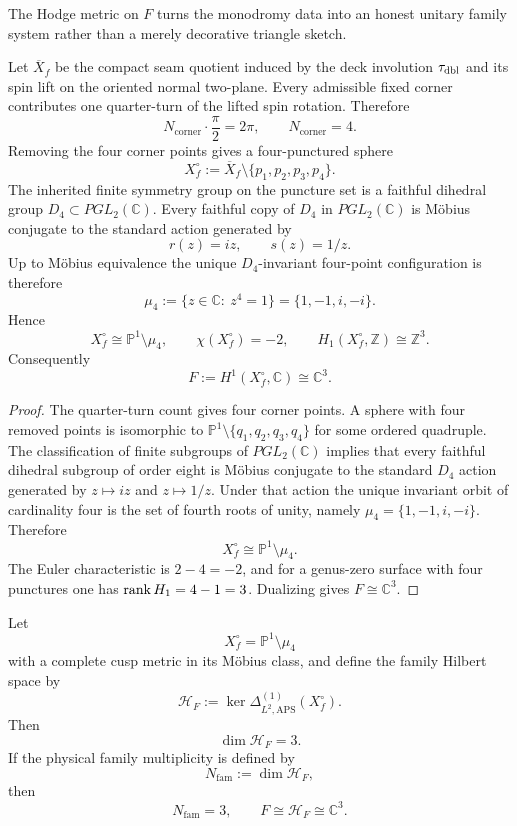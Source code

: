 The Hodge metric on $F$ turns the monodromy data into an honest unitary family system rather than a merely decorative triangle sketch.

\begin{theorem}
\label{thm:topological-family-closure}
Let $\overline X_f$ be the compact seam quotient induced by the deck involution $\tau_{\mathrm{dbl}}$ and its
spin lift on the oriented normal two-plane. Every admissible fixed corner contributes one
quarter-turn of the lifted spin rotation. Therefore
\[
N_{\mathrm{corner}}\cdot \frac{\pi}{2}=2\pi,
\qquad
N_{\mathrm{corner}}=4.
\]
Removing the four corner points gives a four-punctured sphere
\[
X_f^\circ:=\overline X_f\setminus\{p_1,p_2,p_3,p_4\}.
\]
The inherited finite symmetry group on the puncture set is a faithful dihedral group
$D_4\subset PGL_2(\mathbb C)$. Every faithful copy of $D_4$ in $PGL_2(\mathbb C)$ is M\"obius
conjugate to the standard action generated by
\[
r(z)=iz,
\qquad
s(z)=1/z.
\]
Up to M\"obius equivalence the unique $D_4$-invariant four-point configuration is therefore
\[
\mu_4:=\{z\in\mathbb C:\ z^4=1\}=\{1,-1,i,-i\}.
\]
Hence
\[
X_f^\circ\cong \mathbb P^1\setminus\mu_4,
\qquad
\chi(X_f^\circ)=-2,
\qquad
H_1(X_f^\circ,\mathbb Z)\cong \mathbb Z^3.
\]
Consequently
\[
F:=H^1(X_f^\circ,\mathbb C)\cong \mathbb C^3.
\]
\end{theorem}

\begin{proof}
The quarter-turn count gives four corner points. A sphere with four removed points is isomorphic to
$\mathbb P^1\setminus\{q_1,q_2,q_3,q_4\}$ for some ordered quadruple. The classification of finite
subgroups of $PGL_2(\mathbb C)$ implies that every faithful dihedral subgroup of order eight is
M\"obius conjugate to the standard $D_4$ action generated by $z\mapsto iz$ and $z\mapsto 1/z$.
Under that action the unique invariant orbit of cardinality four is the set of fourth roots of
unity, namely $\mu_4=\{1,-1,i,-i\}$. Therefore
\[
X_f^\circ\cong \mathbb P^1\setminus\mu_4.
\]
The Euler characteristic is $2-4=-2$, and for a genus-zero surface with four punctures one has
$\operatorname{rank} H_1=4-1=3$. Dualizing gives $F\cong\mathbb C^3$.
\end{proof}

\begin{theorem}
\label{thm:harmonic-family-modes}
Let
\[
X_f^\circ=\mathbb P^1\setminus\mu_4
\]
with a complete cusp metric in its M\"obius class, and define the family Hilbert space by
\[
\mathcal H_F:=\ker \Delta^{(1)}_{L^2,\mathrm{APS}}(X_f^\circ).
\]
Then
\[
\dim\mathcal H_F=3.
\]
If the physical family multiplicity is defined by
\[
N_{\mathrm{fam}}:=\dim\mathcal H_F,
\]
then
\[
N_{\mathrm{fam}}=3,
\qquad
F\cong \mathcal H_F\cong \mathbb C^3.
\]
\end{theorem}

